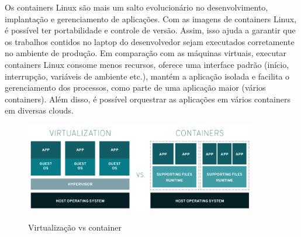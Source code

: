 Os containers Linux são mais um salto evolucionário no desenvolvimento, implantação e gerenciamento de aplicações. Com as imagens de containers Linux, é possível ter portabilidade e controle de versão. Assim, isso ajuda a garantir que os trabalhos contidos no laptop do desenvolvedor sejam executados corretamente no ambiente de produção. Em comparação com as máquinas virtuais, executar containers Linux consome menos recursos, oferece uma interface padrão (início, interrupção, variáveis de ambiente etc.), mantém a aplicação isolada e facilita o gerenciamento dos processos, como parte de uma aplicação maior (vários containers). Além disso, é possível orquestrar as aplicações em vários containers em diversas clouds.

\begin{figure}[!htb]
	\centering
	\caption{Virtualização vs container}
	\includegraphics[width=0.9\textwidth]{figuras/virtualization-vs-containers.png}
	\label{fig:virtualization-vs-containers}
\end{figure}



